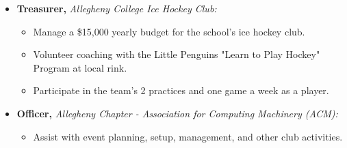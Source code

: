\documentclass[11pt,a4paper,sans]{moderncv}
\begin{document}
\begin{itemize} %
\item \textbf{Treasurer,} \textit{Allegheny College Ice Hockey Club:}
\begin{itemize} %
  \item Manage a \$15,000 yearly budget for the school's ice hockey club.
  \item Volunteer coaching with the Little Penguins "Learn to Play Hockey" Program at local rink.
  \item Participate in the team's 2 practices and one game a week as a player.
\end{itemize} %

\vspace{2pt}

\item \textbf{Officer,} \textit{Allegheny Chapter - Association for Computing Machinery (ACM): }
\begin{itemize} %
  \item Assist with event planning, setup, management, and other club activities.
\end{itemize} %
\end{itemize} %
\end{document}
